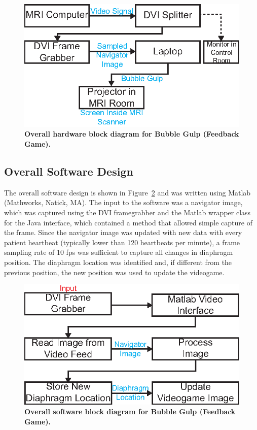 	\begin{figure}
		\centering
		\includegraphics{figures/gamepaper/07-overallHardwareDiagram}
		\caption[Overall hardware block diagram for Bubble Gulp (Feedback Game)]{\textbf{Overall hardware block diagram for Bubble Gulp (Feedback Game).}}
		\label{fig:hardwareblockdiagram}
	\end{figure}

\subsection{Overall Software Design}
	The overall software design is shown in Figure~\ref{fig:softwareblockdiagram} and was written using Matlab (Mathworks, Natick, MA). The input to the software was a navigator image, which was captured using the DVI framegrabber and the Matlab wrapper class for the Java interface, which contained a method that allowed simple capture of the frame. Since the navigator image was updated with new data with every patient heartbeat (typically lower than 120 heartbeats per minute), a frame sampling rate of 10 fps was sufficient to capture all changes in diaphragm position. The diaphragm location was identified and, if different from the previous position, the new position was used to update the videogame.
	
	\begin{figure}
		\centering
		\includegraphics{figures/gamepaper/08-overallSoftwareDiagram}
		\caption[Overall software block diagram for Bubble Gulp (Feedback Game)]{\textbf{Overall software block diagram for Bubble Gulp (Feedback Game).}}
		\label{fig:softwareblockdiagram}
	\end{figure}

